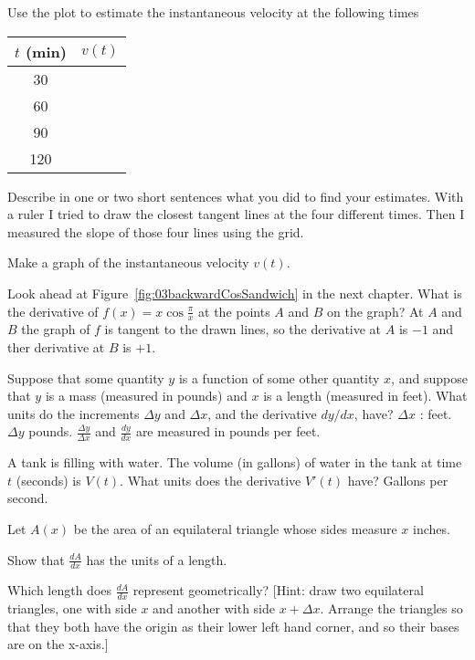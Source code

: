 \begin{multicols}{2}
\subprob Use the plot to estimate the instantaneous
velocity at the following times
\begin{center}
  \begin{tabular}{cp{1in}}
    \toprule
    $t$ (min) &\hfill $v(t)$ \\[1pt]
    \midrule
    30 & \\[1pt]
    \midrule
    60 & \\[1pt]
    \midrule
    90 & \\[1pt]
    \midrule
    120 & \\
    \bottomrule
  \end{tabular}
\end{center}
Describe in one or two short sentences what you did to find
your estimates.
\answer 
With a ruler I tried to draw the closest tangent lines at
the four different times.  Then I measured the slope of those
four lines using the grid.
\endanswer

\subprob Make a graph of the instantaneous velocity $v(t)$.

\problem Look ahead at Figure~\ref{fig:03backwardCosSandwich} in the next 
chapter.  What is the derivative of $f(x) = x\cos\frac\pi x$ at the
points $A$ and $B$ on the graph?
\answer 
At $A$ and $B$ the graph of $f$ is tangent to the drawn lines, so
the derivative at $A$ is $-1$ and ther derivative at $B$ is $+1$.
\endanswer
  
\problem Suppose that some quantity $y$ is a function of some other quantity 
$x$, and suppose that $y$ is a mass (measured in pounds)
and $x$ is a length (measured in feet).  What units do the increments
$\Delta y$ and $\Delta x$, and the derivative $ dy/d x$, have?
\answer 
$\Delta x$ : feet.  $\Delta y$ pounds. $\frac{\Delta y}{\Delta x}$
and $\frac{dy}{dx}$ are measured in pounds per feet.
\endanswer

\problem A tank is filling with water.  The volume (in gallons) of water in 
the tank at time $t$ (seconds) is $V(t)$.  What units does the
derivative $V'(t)$ have?
\answer 
Gallons per second.
\endanswer

\problem \groupproblem Let $A(x)$ be the area of an equilateral triangle whose
sides measure $x$ inches.

\subprob Show that $\frac{dA}{dx}$ has the units of a length.

\subprob Which length does $\frac{dA}{dx}$ represent geometrically?  [Hint: draw
two equilateral triangles, one with side $x$ and another with side $x+\Delta x$.
Arrange the triangles so that they both have the origin as their lower left hand
corner, and so their bases are on the x-axis.]


\end{multicols}
